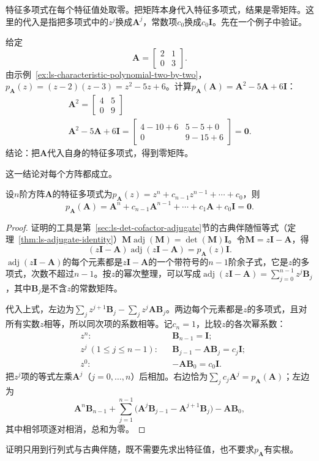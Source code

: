 特征多项式在每个特征值处取零。把矩阵本身代入特征多项式，结果是零矩阵。这里的代入是指把多项式中的$z^j$换成$\bm A^j$，常数项$c_0$换成$c_0\bm I$。先在一个例子中验证。
\begin{example}[把矩阵代入它的特征多项式]
\label{ex:ls-cayley-hamilton-two-by-two}
给定
\[
 \bm A=\begin{bmatrix}2&1\\0&3\end{bmatrix}.
\]
由示例~\ref{ex:ls-characteristic-polynomial-two-by-two}，$p_{\bm A}(z)=(z-2)(z-3)=z^2-5z+6$。计算$p_{\bm A}(\bm A)=\bm A^2-5\bm A+6\bm I$：
\[
\begin{gathered}
\bm A^2=\begin{bmatrix}4&5\\0&9\end{bmatrix}\\
\bm A^2-5\bm A+6\bm I
 =\begin{bmatrix}4-10+6&5-5+0\\0&9-15+6\end{bmatrix}
 =\bm0 .
\end{gathered}
\]
结论：把$\bm A$代入自身的特征多项式，得到零矩阵。
\end{example}
这一结论对每个方阵都成立。
\begin{theorem}
\label{thm:ls-cayley-hamilton}
设$n$阶方阵$\bm A$的特征多项式为$p_{\bm A}(z)=z^n+c_{n-1}z^{n-1}+\cdots+c_0$，则
\[
 p_{\bm A}(\bm A)
 =\bm A^n+c_{n-1}\bm A^{n-1}+\cdots+c_1\bm A+c_0\bm I=\bm0.
\]
\end{theorem}
\begin{proof}
证明的工具是第~\ref{sec:ls-det-cofactor-adjugate}节的古典伴随恒等式（定理~\ref{thm:ls-adjugate-identity}）$\bm M\operatorname{adj}(\bm M)=\det(\bm M)\bm I$。令$\bm M=z\bm I-\bm A$，得
\[
 (z\bm I-\bm A)\operatorname{adj}(z\bm I-\bm A)=p_{\bm A}(z)\bm I .
\]
$\operatorname{adj}(z\bm I-\bm A)$的每个元素都是$z\bm I-\bm A$的一个带符号的$n-1$阶余子式，它是$z$的多项式，次数不超过$n-1$。按$z$的幂次整理，可以写成$\operatorname{adj}(z\bm I-\bm A)=\sum_{j=0}^{n-1}z^j\bm B_j$，其中$\bm B_j$是不含$z$的常数矩阵。

代入上式，左边为$\sum_jz^{j+1}\bm B_j-\sum_jz^j\bm A\bm B_j$。两边每个元素都是$z$的多项式，且对所有实数$z$相等，所以同次项的系数相等。记$c_n=1$，比较$z$的各次幂系数：
\[
 \begin{aligned}
 &z^n: &&\bm B_{n-1}=\bm I;\\
 &z^j\ (1\leq j\leq n-1): &&\bm B_{j-1}-\bm A\bm B_j=c_j\bm I;\\
 &z^0: &&-\bm A\bm B_0=c_0\bm I .
 \end{aligned}
\]
把$z^j$项的等式左乘$\bm A^j$（$j=0,\ldots,n$）后相加。右边恰为$\sum_jc_j\bm A^j=p_{\bm A}(\bm A)$；左边为
\[
 \bm A^n\bm B_{n-1}+\sum_{j=1}^{n-1}\bigl(\bm A^j\bm B_{j-1}-\bm A^{j+1}\bm B_j\bigr)-\bm A\bm B_0 ,
\]
其中相邻项逐对相消，总和为零。
\end{proof}
证明只用到行列式与古典伴随，既不需要先求出特征值，也不要求$p_{\bm A}$有实根。

